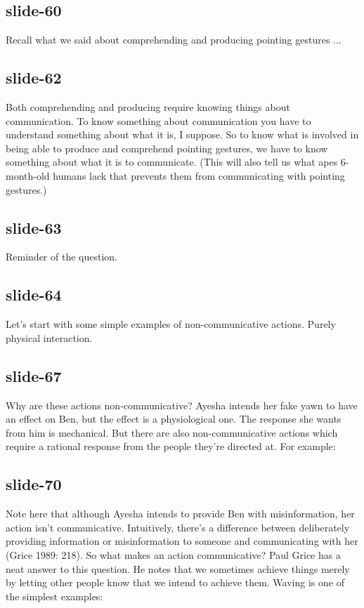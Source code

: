 \documentclass[12pt,\papersize]{extarticle}
\begin{document}
 
\subsection{slide-60}
Recall what we said about comprehending and producing pointing gestures ...
 
 
\subsection{slide-62}
Both comprehending and producing require knowing things about communication.
To know something about communication you have to understand something about what it is, I suppose.
So to know what is involved in being able to produce and comprehend pointing gestures, we have to know something about what it is to communicate.
(This will also tell us what apes 6-month-old humans lack that prevents them from communicating with pointing gestures.)
 
 
\subsection{slide-63}
Reminder of the question.
 
 
\subsection{slide-64}
Let’s start with some simple examples of non-communicative actions.
Purely physical interaction.
 
 
\subsection{slide-67}
Why are these actions non-communicative? Ayesha intends her fake yawn to have an effect on Ben, but the effect is a physiological one. The response she wants from him is mechanical.
But there are also non-communicative actions which require a rational response from the people they’re directed at. For example:
 
 
\subsection{slide-70}
Note here that although Ayesha intends to provide Ben with misinformation, her action isn’t communicative.
Intuitively, there’s a difference between deliberately providing information or misinformation to someone and communicating with her (Grice 1989: 218).
So what makes an action communicative?
Paul Grice has a neat answer to this question.
He notes that we sometimes achieve things merely by letting other people know that we intend to achieve them.
Waving is one of the simplest examples:
 
\end{document}
